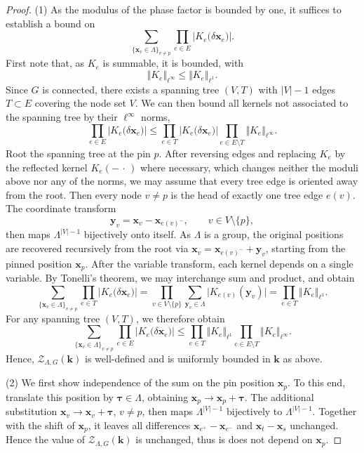 \documentclass[]{amsart}
\numberwithin{mythm}{section}
\begin{document}
\begin{proof}
(1) As the modulus of the phase factor is bounded by one, it suffices to establish a bound on
\[
\sum_{\{\bm x_{v}\in\Lambda\}_{v\neq p}}
\prod_{e\in E}
|{K}_{e}\big(\delta\bm x_e\big)|.
\]
First note that, as $K_e$ is summable, it is bounded, with 
\[
\Vert K_e\Vert_{\ell^\infty}\le \Vert K_e\Vert_{\ell^1}.
\]  
Since $G$ is connected, there exists a spanning tree $(V,T)$ with $|V|-1$ edges $T\subset E$ covering the node set $V$. We can then bound all kernels not associated to the spanning tree by their $\ell^{\infty}$ norms,
\[
\prod_{e\in E}
|{K}_{e}\big(\delta\bm x_e\big)| \le  \prod_{e\in T} \vert{K}_{e}\big(\delta\bm x_e\big)\vert \prod_{e\in E\setminus T} \Vert K_e\Vert_{\ell^\infty}.
\]
Root the spanning tree at the pin $p$. After reversing edges and replacing $K_e$ by the reflected kernel $K_e(-\,\cdot\,)$ where necessary, which changes neither the moduli above nor any of the norms, we may assume that every tree edge is oriented away from the root. Then every node $v\neq p$ is the head of exactly one tree edge $e(v)$. The coordinate transform
\[
\bm y_{v}=\bm x_{v}-\bm x_{e(v)^-}, \qquad v\in V\setminus\{p\},
\]
then maps $\Lambda^{\vert V\vert-1}$ bijectively onto itself. As $\Lambda$ is a group, the original positions are recovered recursively from the root via $\bm x_v=\bm x_{e(v)^-}+\bm y_v$, starting from the pinned position $\bm x_p$. After the variable transform, each kernel depends on a single variable. By Tonelli's theorem, we may interchange sum and product, and obtain
\[
\sum_{\{\bm x_{v}\in\Lambda\}_{v\neq p}}
\prod_{e\in T}
\vert{K}_{e}\big(\delta\bm x_e\big)\vert
= \prod_{v\in V\setminus \{p\}} \sum_{\bm y_{v}\in \Lambda}
\vert K_{e(v)}(\bm y_{v})\vert
= \prod_{e\in T} \Vert K_e\Vert_{\ell^{1}}.
\]   
For any spanning tree $(V,T)$, we therefore obtain
\[
\sum_{\{\bm x_{v}\in\Lambda\}_{v\neq p}}
\prod_{e\in E}
\vert {K}_{e}\big(\delta\bm x_e\big)\vert\le \prod_{e\in T} \Vert K_e\Vert_{\ell^1} \prod_{e\in E\setminus T} \Vert K_e\Vert_{\ell^\infty}.
\]
Hence, $\mathcal Z_{\Lambda,G}(\bm k)$ is well-defined and is uniformly bounded in $\bm k$ as above.

(2) We first show independence of the sum on the pin position $\bm x_p$. To this end, translate this position by $\bm \tau \in \Lambda$, obtaining $\bm x_p\to \bm x_p + \bm \tau$. The additional substitution $\bm x_v \to \bm x_v+\bm \tau$, $v\neq p$, then maps $\Lambda^{|V|-1}$ bijectively to $\Lambda^{|V|-1}$. Together with the shift of $\bm x_p$, it leaves all differences $\bm x_{e^+}-\bm x_{e^-}$ and $\bm x_{t}-\bm x_s$ unchanged. Hence the value of $\mathcal Z_{\Lambda,G}(\bm k)$ is unchanged, thus is does not depend on $\bm x_p$. 


\end{proof}
\end{document}
